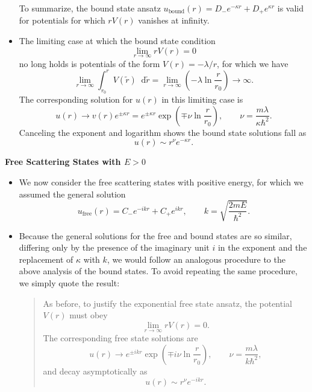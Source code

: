 \documentclass[11pt, a4paper]{article}
\newcommand{\diff}{\mathop{}\!\mathrm{d}} %
\renewcommand{\t}[1]{\tilde{#1}}
\begin{document}
\begin{itemize}
	
	To summarize, the bound state ansatz $ u_{\text{bound}}(r) = D_{-}e^{-\kappa r} + D_{+}e^{\kappa r} $ is valid for potentials for which $ r V(r) $ vanishes at infinity.
	
	\item The limiting case at which the bound state condition 
	\begin{equation*}
		\lim_{r \to \infty}rV(r) = 0
	\end{equation*}
	no long holds is potentials of the form $ V(r) = - \lambda/r $, for which we have
	\begin{equation*}
		\lim_{r \to \infty} \int_{r_{0}}^{r}V(\t{r})\diff \t{r} = \lim_{r \to \infty} \left(- \lambda \ln \frac{r}{r_{0}}\right) \to \infty.
	\end{equation*}
	The corresponding solution for $ u(r) $ in this limiting case is
	\begin{equation*}
		u(r) \to v(r)e^{\pm \kappa r} = e^{\pm \kappa r} \exp(\mp \nu \ln  \frac{r}{r_{0}}), \qquad \nu = \frac{m \lambda}{\kappa \hbar^{2}}.
	\end{equation*}
	Canceling the exponent and logarithm shows the bound state solutions fall as
	\begin{equation*}
		u(r) \sim r^{\nu} e^{- \kappa r}.
	\end{equation*}
	
\end{itemize}

\textbf{Free Scattering States with $ E > 0 $}
\begin{itemize}
	\item We now consider the free scattering states with positive energy, for which we assumed the general solution
	\begin{equation*}
		u_{\text{free}}(r) = C_{-}e^{-i k r} + C_{+}e^{i k r}, \qquad k = \sqrt{\frac{2mE}{\hbar^{2}}}.
	\end{equation*}
	
	\item Because the general solutions for the free and bound states are so similar, differing only by the presence of the imaginary unit $ i $ in the exponent and the replacement of $ \kappa $ with $ k $, we would follow an analogous procedure to the above analysis of the bound states. To avoid repeating the same procedure, we simply quote the result: 
    \begin{quote}
        As before, to justify the exponential free state ansatz, the potential $ V(r) $ must obey
        \begin{equation*}
            \lim_{r \to \infty} r V(r) = 0.
        \end{equation*}
        The corresponding free state solutions are
        \begin{equation*}
            u(r) \to e^{\pm i k r} \exp(\mp i \nu \ln  \frac{r}{r_{0}}), \qquad \nu = \frac{m \lambda}{k \hbar^{2}},
        \end{equation*}
        and decay asymptotically as
        \begin{equation*}
            u(r) \sim r^{\nu} e^{- ik r}.
        \end{equation*}
    \end{quote}
\end{itemize}
\end{document}
